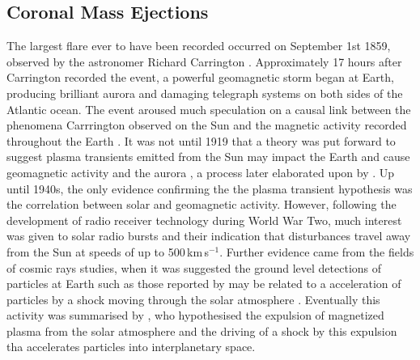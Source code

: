 \subsection{Coronal Mass Ejections}\label{sec:20}

The largest flare ever to have been recorded occurred on September 1st 1859, observed by the astronomer Richard Carrington \citep{carrington1859}. Approximately 17 hours after Carrington recorded the event, a powerful geomagnetic storm began at Earth, producing brilliant aurora and damaging telegraph systems on both sides of the Atlantic ocean. The event aroused much speculation on a causal link between the phenomena Carrrington observed on the Sun and the magnetic activity recorded throughout the Earth \citep{balfour1861}. It was not until 1919 that a theory was put forward to suggest plasma transients emitted from the Sun may impact the Earth and cause geomagnetic activity and the aurora \citet{lindemann1919}, a process later elaborated upon by \citet{chapman1930}. Up until 1940s, the only evidence confirming the the plasma transient hypothesis was the correlation between solar and geomagnetic activity. However, following the development of radio receiver technology during World War Two, much interest was given to solar radio bursts and their indication that disturbances travel away from the Sun at speeds of up to 500\,km\,s$^{-1}$\citep{wild1958}. Further evidence came from the fields of cosmic rays studies, when it was suggested the ground level detections of particles at Earth such as those reported by \citep{forbush1946} may be related to a acceleration of particles by a shock moving through the solar atmosphere \citep{wild1963}. Eventually this activity was summarised by \citet{gold1962}, who hypothesised the expulsion of magnetized plasma from the solar atmosphere and the driving of a shock by this expulsion tha accelerates particles into interplanetary space. 

